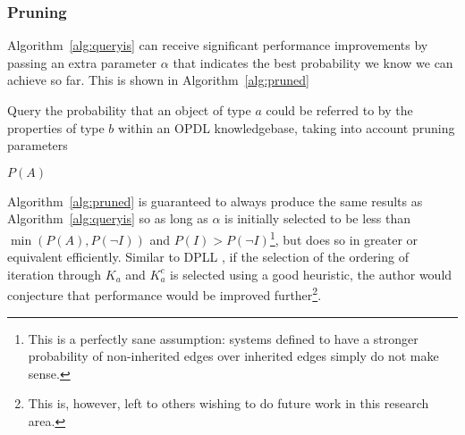 \documentclass[12pt]{article}
\begin{document}
\subsubsection{Pruning}

Algorithm~\ref{alg:queryis} can receive significant performance improvements by
passing an extra parameter $\alpha$ that indicates the best probability we know
we can achieve so far. This is shown in Algorithm~\ref{alg:pruned}

\begin{algorithm}
    \caption{Query the probability that an object of type $a$ could be referred
    to by the properties of type $b$ within an OPDL knowledgebase, taking into
    account pruning parameters}
    \label{alg:pruned}

    \begin{algorithmic}
                \State {}
            \EndIf
                \State \Return $P(A)$
            \EndIf
                \EndIf
            \EndFor
                    \EndIf
                \EndFor
            \EndIf
            \State\Return{$\alpha$}
        \EndProcedure
    \end{algorithmic}
\end{algorithm}

Algorithm~\ref{alg:pruned} is guaranteed to always produce the same results as
Algorithm~\ref{alg:queryis} so as long as $\alpha$ is initially selected to be
less than $\min(P(A), P(\lnot I))$ and $P(I) > P(\lnot I)$\footnote{This is a
perfectly sane assumption: systems defined to have a stronger probability of
non-inherited edges over inherited edges simply do not make sense.}, but does
so in greater or equivalent efficiently. Similar to DPLL \cite{dpllheuristic},
if the selection of the ordering of iteration through $K_a$ and $K_a^c$ is
selected using a good heuristic, the author would conjecture that performance
would be improved further\footnote{This is, however, left to others wishing to
do future work in this research area.}.
\end{document}
